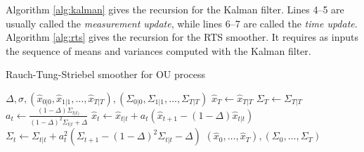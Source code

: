 \documentclass[fleqn]{article}
\begin{document}

Algorithm \ref{alg:kalman} gives the recursion for the Kalman filter. Lines 4--5 are usually called the \emph{measurement update}, while lines 6--7 are called the \emph{time update}. 
Algorithm \ref{alg:rts} gives the recursion for the RTS smoother. It requires as inputs the sequence of means and variances computed with the Kalman filter.

\begin{algorithm}
\caption{Rauch-Tung-Striebel smoother for OU process}
\label{alg:rts}
\begin{algorithmic}[1]
\Require $\Delta, \sigma, (\hat{x}_{0|0}, \hat{x}_{1|1}, \dots, \hat{x}_{T|T}), (\Sigma_{0|0}, \Sigma_{1|1}, \dots, \Sigma_{T|T})$
\State $\hat{x}_T \gets \hat{x}_{T|T}$
\State $\Sigma_T \gets \Sigma_{T|T}$
	\State $a_t \gets \frac{(1-\Delta) \Sigma_{t|t)}}{(1-\Delta)^2 \Sigma_{t|t}+ \Delta}$
	\State $\hat{x}_t \gets \hat{x}_{t|t} + a_t (\hat{x}_{t+1} - (1-\Delta)\hat{x}_{t|t})$
	\State $\Sigma_t \gets \Sigma_{t|t} + a_t^2 (\Sigma_{t+1} - (1-\Delta)^2 \Sigma_{t|t} - \Delta)$
\EndFor
\State\Return $(\hat{x}_0, \dots, \hat{x}_T), (\Sigma_0, \dots, \Sigma_T)$
\end{algorithmic}
\end{algorithm}


\end{document}
